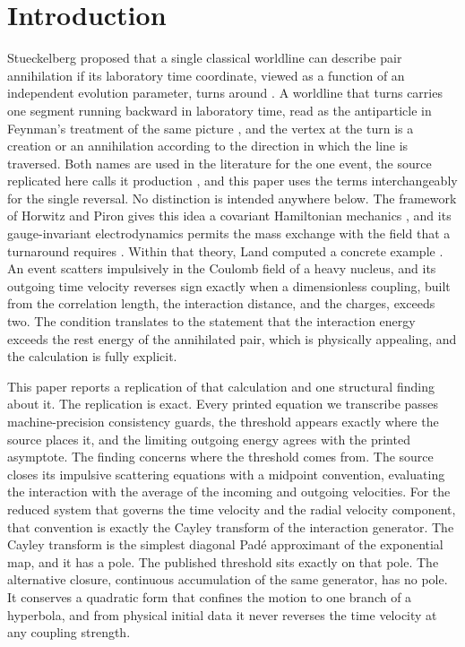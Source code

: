 \documentclass[aps,prd,reprint,nofootinbib]{revtex4-2}
\begin{document}
\maketitle

\section{Introduction}
\label{sec:intro}

Stueckelberg proposed that a single classical worldline can describe pair
annihilation if its laboratory time coordinate, viewed as a function of an
independent evolution parameter, turns around \cite{Stueckelberg1941,
Stueckelberg1942}.  A worldline that turns carries one segment running
backward in laboratory time, read as the antiparticle in Feynman's
treatment of the same picture \cite{Feynman1949}, and the vertex at the
turn is a creation or an annihilation according to the direction in
which the line is traversed.  Both names are used in the literature for
the one event, the source replicated here calls it production
\cite{Land2016}, and this paper uses the terms interchangeably for the
single reversal.  No distinction is intended anywhere below.
The framework of Horwitz and Piron gives this idea a
covariant Hamiltonian mechanics \cite{HorwitzPiron1973}, and its
gauge-invariant electrodynamics permits the mass exchange with the field
that a turnaround requires \cite{LandBook}.  Within that theory, Land
computed a concrete example \cite{Land2016}.  An event scatters
impulsively in the Coulomb field of a heavy nucleus, and its outgoing
time velocity reverses sign exactly when a dimensionless coupling,
built from the correlation length, the interaction distance, and the
charges, exceeds two.  The condition translates to the statement that
the interaction energy exceeds the rest energy of the annihilated pair,
which is physically appealing, and the calculation is fully explicit.

This paper reports a replication of that calculation and one structural
finding about it.  The replication is exact.  Every printed equation we
transcribe passes machine-precision consistency guards, the threshold
appears exactly where the source places it, and the limiting outgoing
energy agrees with the printed asymptote.  The finding concerns where
the threshold comes from.  The source closes its impulsive scattering
equations with a midpoint convention, evaluating the interaction with
the average of the incoming and outgoing velocities.  For the reduced
system that governs the time velocity and the radial velocity component,
that convention is exactly the Cayley transform of the interaction
generator.  The Cayley transform is the simplest diagonal Pad\'e
approximant of the exponential map, and it has a pole.  The published
threshold sits exactly on that pole.  The alternative closure,
continuous accumulation of the same generator, has no pole.  It
conserves a quadratic form that confines the motion to one branch of a
hyperbola, and from physical initial data it never reverses the time
velocity at any coupling strength.
\end{document}
